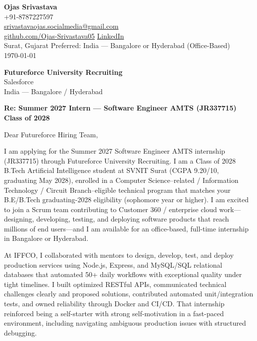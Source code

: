 \documentclass[a4paper,11pt]{article}
\begin{document}
\begin{flushright}
\textbf{Ojas Srivastava} \\
+91-8787227597 \\
\href{mailto:srivastavaojas.socialmedia@gmail.com}{srivastavaojas.socialmedia@gmail.com} \\
\href{https://github.com/Ojas-Srivastava05}{github.com/Ojas-Srivastava05} \textbar{}
\href{https://linkedin.com/in/ojas-srivastava05}{LinkedIn} \\
Surat, Gujarat \textbar{} Preferred: India --- Bangalore or Hyderabad (Office-Based) \\
\today
\end{flushright}

\vspace{4mm}
\textbf{Futureforce University Recruiting} \\
Salesforce \\
India --- Bangalore / Hyderabad

\vspace{2mm}
\textbf{Re: Summer 2027 Intern --- Software Engineer AMTS (JR337715) \textbar{} Class of 2028}

Dear Futureforce Hiring Team,

I am applying for the Summer 2027 Software Engineer AMTS internship (JR337715) through Futureforce University Recruiting. I am a Class of 2028 B.Tech Artificial Intelligence student at SVNIT Surat (CGPA 9.20/10, graduating May 2028), enrolled in a Computer Science--related / Information Technology / Circuit Branch--eligible technical program that matches your B.E/B.Tech graduating-2028 eligibility (sophomore year or higher). I am excited to join a Scrum team contributing to Customer 360 / enterprise cloud work---designing, developing, testing, and deploying software products that reach millions of end users---and I am available for an office-based, full-time internship in Bangalore or Hyderabad.

At IFFCO, I collaborated with mentors to design, develop, test, and deploy production services using Node.js, Express, and MySQL/SQL relational databases that automated 50+ daily workflows with exceptional quality under tight timelines. I built optimized RESTful APIs, communicated technical challenges clearly and proposed solutions, contributed automated unit/integration tests, and owned reliability through Docker and CI/CD. That internship reinforced being a self-starter with strong self-motivation in a fast-paced environment, including navigating ambiguous production issues with structured debugging.
\end{document}
